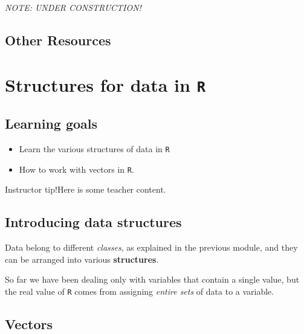 \documentclass[
]{book}
\providecommand{\tightlist}{%
  \setlength{\itemsep}{0pt}\setlength{\parskip}{0pt}}
\begin{document}
\emph{NOTE: UNDER CONSTRUCTION!}

\hypertarget{other-resources-2}{%
\section*{Other Resources}\label{other-resources-2}}

\hypertarget{structures-for-data-in-r}{%
\chapter{\texorpdfstring{Structures for data in \texttt{R}}{Structures for data in R}}\label{structures-for-data-in-r}}

\hypertarget{learning-goals-3}{%
\section*{Learning goals}\label{learning-goals-3}}

\begin{itemize}
\tightlist
\item
  Learn the various structures of data in \texttt{R}\\
\item
  How to work with vectors in \texttt{R}.
\end{itemize}

Instructor tip!Here is some teacher content.

\hypertarget{introducing-data-structures}{%
\section*{Introducing data structures}\label{introducing-data-structures}}

Data belong to different \emph{classes}, as explained in the previous module, and they can be arranged into various \textbf{structures}.

So far we have been dealing only with variables that contain a single value, but the real value of \texttt{R} comes from assigning \emph{entire sets} of data to a variable.

\hypertarget{vectors}{%
\section*{Vectors}\label{vectors}}
\end{document}
